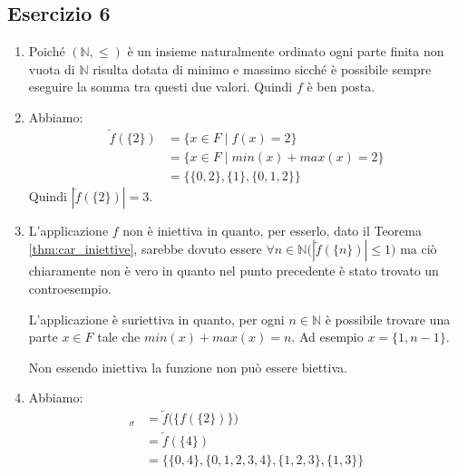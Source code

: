 \subsection*{Esercizio 6}
\begin{enumerate}[label=(\textit{\roman*})]
	\item Poiché $(\mathbb{N},\leq)$ è un insieme naturalmente ordinato ogni parte finita non vuota di $\mathbb{N}$ risulta dotata di minimo e massimo sicché è possibile sempre eseguire la somma tra questi due valori. Quindi $f$ è ben posta.
	\item Abbiamo:
	\begin{align*}
		\overleftarrow{f}(\{2\}) &= \{x \in F \; | \; f(x) = 2\} \\
		&= \{x \in F \; | \; min(x) + max(x) = 2\} \\
		&= \{ \{0,2\},\{1\},\{0,1,2\}\}
	\end{align*}
	Quindi $|\overleftarrow{f}(\{2\})|=3$.
	\item L'applicazione $f$ non è iniettiva in quanto, per esserlo, dato il Teorema \ref{thm:car_iniettive}, sarebbe dovuto essere $\forall n \in \mathbb{N} \bigl(|\overleftarrow{f}(\{n\})| \leq 1\bigr)$ ma ciò chiaramente non è vero in quanto nel punto precedente è stato trovato un controesempio.
	
	L'applicazione è suriettiva in quanto, per ogni $n \in \mathbb{N}$ è possibile trovare una parte $x \in F$ tale che $min(x)+max(x)=n$. Ad esempio $x=\{1,n-1\}$.
	
	Non essendo iniettiva la funzione non può essere biettiva.
	
	\item Abbiamo:
	\begin{align*}
		[\{2\}]_{\sigma} &= \overleftarrow{f}\bigl(\{f(\{2\})\}\bigr) \\
		&= \overleftarrow{f}(\{4\}) \\
		&= \{\{0,4\},\{0,1,2,3,4\},\{1,2,3\},\{1,3\}\}
	\end{align*}
	

\end{enumerate}

